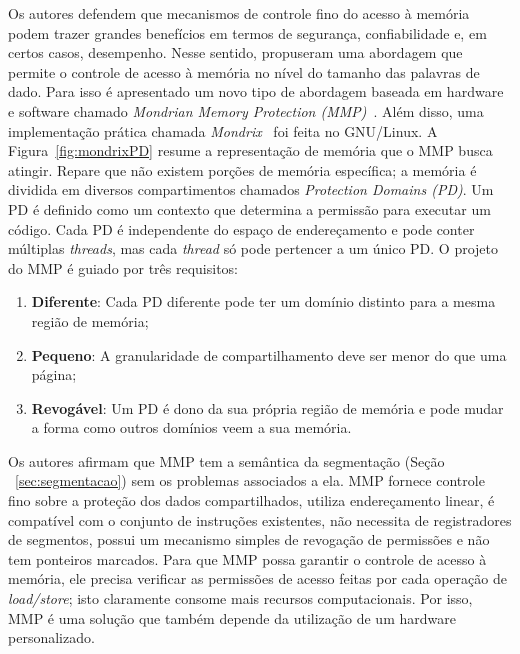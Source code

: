 Os autores defendem que mecanismos de controle fino do acesso à memória podem
trazer grandes benefícios em termos de segurança, confiabilidade e, em certos
casos, desempenho. Nesse sentido, \citet{mmp} propuseram uma abordagem
que permite o controle de acesso à memória no nível do tamanho das palavras de
dado. Para isso é apresentado um novo tipo de abordagem baseada em hardware e
software chamado \emph{Mondrian Memory Protection (MMP)}~\citep{mmp}. Além
disso, uma implementação prática chamada \emph{Mondrix}~\citep{mondrix} foi
feita no GNU/Linux. A Figura~\ref{fig:mondrixPD} resume a representação de
memória que o MMP busca atingir. Repare que não existem porções de memória
específica; a memória é dividida em diversos compartimentos chamados
\emph{Protection Domains (PD)}. Um PD é definido como um contexto que determina
a permissão para executar um código. Cada PD é independente do espaço de
endereçamento e pode conter múltiplas \emph{threads}, mas cada \emph{thread} só
pode pertencer a um único PD.  O projeto do MMP é guiado por três requisitos:

\begin{enumerate}
	\item \textbf{Diferente}: Cada PD diferente pode ter um domínio distinto
				para a mesma região de memória;
	\item \textbf{Pequeno}: A granularidade de compartilhamento deve ser menor
				do que uma página;
	\item \textbf{Revogável}: Um PD é dono da sua própria região de memória e
				pode mudar a forma como outros domínios veem a sua memória.
\end{enumerate}

Os autores afirmam que MMP tem a semântica da segmentação (Seção ~\ref{sec:segmentacao}) sem os problemas
associados a ela. MMP fornece controle fino sobre a proteção dos dados
compartilhados, utiliza endereçamento linear, é compatível com o conjunto de instruções
existentes, não necessita de registradores de segmentos, possui um mecanismo
simples de revogação de permissões e não tem ponteiros marcados. Para que
MMP possa garantir o controle de acesso à memória, ele precisa verificar as
permissões de acesso feitas por cada operação de \emph{load/store}; isto
claramente consome mais recursos computacionais. Por isso, MMP é uma solução
que também depende da utilização de um hardware personalizado.


